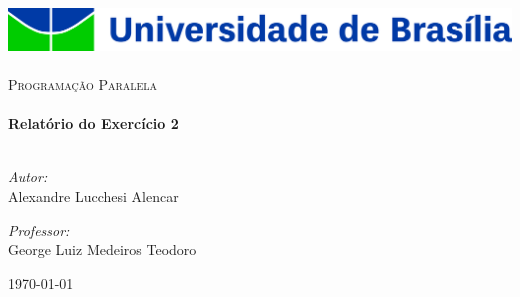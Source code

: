 \begin{titlepage}

\begin{center}

\includegraphics[width=1.0\textwidth]{img/unb_logo.jpg}~\\[1cm]

\textsc{\Large Programação Paralela}\\[0.5cm]

\HRule\\[0.4cm]
{\huge \bfseries Relatório do Exercício 2\\[0.4cm]}
\HRule\\[1.5cm]

\begin{minipage}{0.4\textwidth}
\begin{flushleft} \large
\textit{Autor:}\\
\small{Alexandre Lucchesi Alencar}
\end{flushleft}
\end{minipage}
\begin{minipage}{0.4\textwidth}
\begin{flushright} \large
\textit{Professor:}\\
\small{George Luiz Medeiros Teodoro}
\end{flushright}
\end{minipage}

\vfill

{\large \today}

\end{center}

\end{titlepage}

